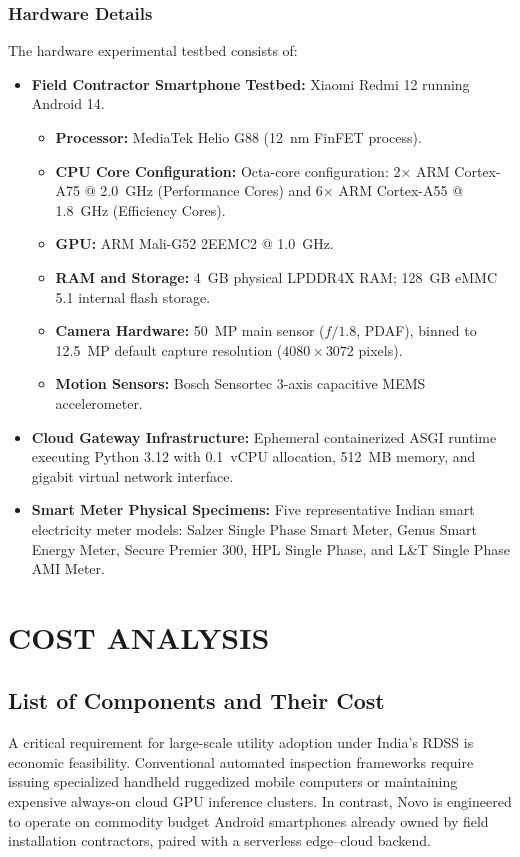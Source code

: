 \documentclass[12pt,a4paper,oneside]{report}
\begin{document}
\subsection{Hardware Details}
The hardware experimental testbed consists of:
\begin{itemize}
    \item \textbf{Field Contractor Smartphone Testbed:} Xiaomi Redmi 12 running Android 14.
    \begin{itemize}
        \item \textbf{Processor:} MediaTek Helio G88 (12~nm FinFET process).
        \item \textbf{CPU Core Configuration:} Octa-core configuration: 2$\times$ ARM Cortex-A75 @ 2.0~GHz (Performance Cores) and 6$\times$ ARM Cortex-A55 @ 1.8~GHz (Efficiency Cores).
        \item \textbf{GPU:} ARM Mali-G52 2EEMC2 @ 1.0~GHz.
        \item \textbf{RAM and Storage:} 4~GB physical LPDDR4X RAM; 128~GB eMMC 5.1 internal flash storage.
        \item \textbf{Camera Hardware:} 50~MP main sensor ($f/1.8$, PDAF), binned to 12.5~MP default capture resolution ($4080\times 3072$ pixels).
        \item \textbf{Motion Sensors:} Bosch Sensortec 3-axis capacitive MEMS accelerometer.
    \end{itemize}
    \item \textbf{Cloud Gateway Infrastructure:} Ephemeral containerized ASGI runtime executing Python 3.12 with 0.1~vCPU allocation, 512~MB memory, and gigabit virtual network interface.
    \item \textbf{Smart Meter Physical Specimens:} Five representative Indian smart electricity meter models: Salzer Single Phase Smart Meter, Genus Smart Energy Meter, Secure Premier 300, HPL Single Phase, and L\&T Single Phase AMI Meter.
\end{itemize}

\clearpage

\chapter{COST ANALYSIS}
\label{chap:cost}

\section{List of Components and Their Cost}
A critical requirement for large-scale utility adoption under India's RDSS is economic feasibility. Conventional automated inspection frameworks require issuing specialized handheld ruggedized mobile computers or maintaining expensive always-on cloud GPU inference clusters. In contrast, Novo is engineered to operate on commodity budget Android smartphones already owned by field installation contractors, paired with a serverless edge--cloud backend.
\end{document}

